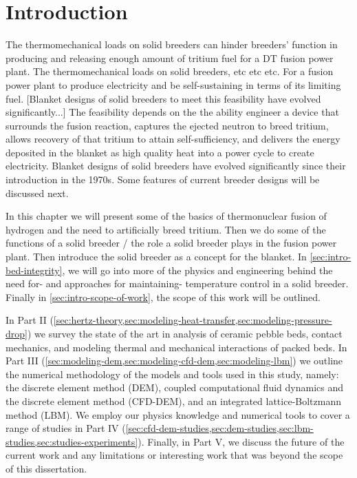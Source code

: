\chapter{Introduction} \label{sec:introduction}
The thermomechanical loads on solid breeders can hinder breeders' function in producing and releasing enough amount of tritium fuel for a DT fusion power plant. The thermomechanical loads on solid breeders, etc etc etc. For a fusion power plant to produce electricity and be self-sustaining in terms of its limiting fuel. [Blanket designs of solid breeders to meet this feasibility have evolved significantly...] The feasibility depends on the the ability engineer a device that surrounds the fusion reaction, captures the ejected neutron to breed tritium, allows recovery of that tritium to attain self-sufficiency, and delivers the energy deposited in the blanket as high quality heat into a power cycle to create electricity. Blanket designs of solid breeders have evolved significantly since their introduction in the 1970s. Some features of current breeder designs will be discussed next.

In this chapter we will present some of the basics of thermonuclear fusion of hydrogen and the need to artificially breed tritium.  Then we do some of the functions of a solid breeder / the role a solid breeder plays in the fusion power plant. Then introduce the solid breeder as a concept for the blanket. In \cref{sec:intro-bed-integrity}, we will go into more of the physics and engineering behind the need for- and approaches for maintaining- temperature control in a solid breeder. Finally in \cref{sec:intro-scope-of-work}, the scope of this work will be outlined.











In Part II (\cref{sec:hertz-theory,sec:modeling-heat-transfer,sec:modeling-pressure-drop}) we survey the state of the art in analysis of ceramic pebble beds, contact mechanics, and modeling thermal and mechanical interactions of packed beds.  In Part III (\cref{sec:modeling-dem,sec:modeling-cfd-dem,sec:modeling-lbm}) we outline the numerical methodology of the models and tools used in this study, namely: the discrete element method (DEM), coupled computational fluid dynamics and the discrete element method (CFD-DEM), and an integrated lattice-Boltzmann method (LBM). We employ our physics knowledge and numerical tools to cover a range of studies in Part IV (\cref{sec:cfd-dem-studies,sec:dem-studies,sec:lbm-studies,sec:studies-experiments}). Finally, in Part V, we discuss the future of the current work and any limitations or interesting work that was beyond the scope of this dissertation.